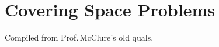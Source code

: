 \chapter{Covering Space Problems}
Compiled from Prof.\,McClure's old quals.
\begin{problem}[]
\end{problem}

